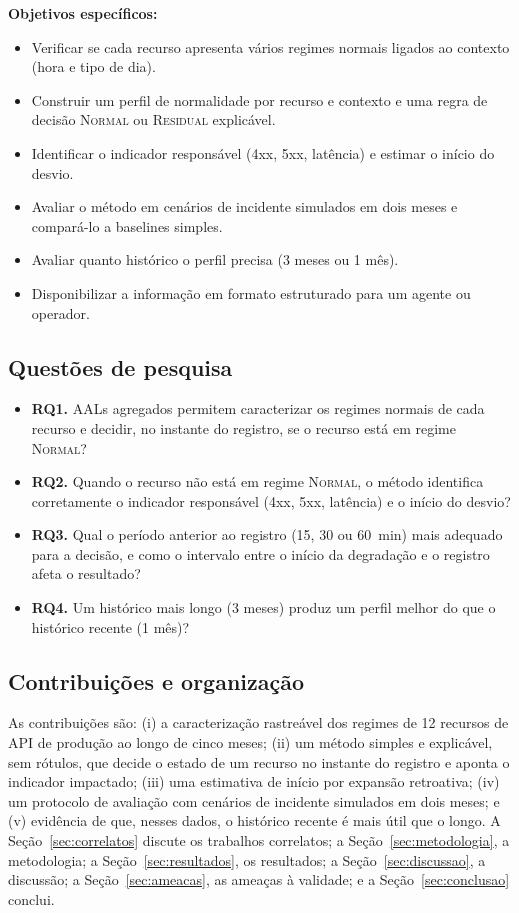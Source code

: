 \documentclass[sigconf,nonacm]{acmart}
\newcommand{\Normal}{\textsc{Normal}\xspace}
\newcommand{\Residual}{\textsc{Residual}\xspace}
\begin{document}
\textbf{Objetivos específicos:}
\begin{itemize}
  \item Verificar se cada recurso apresenta vários regimes normais ligados ao contexto (hora e tipo de dia).
  \item Construir um perfil de normalidade por recurso e contexto e uma regra de decisão \Normal ou \Residual explicável.
  \item Identificar o indicador responsável (4xx, 5xx, latência) e estimar o início do desvio.
  \item Avaliar o método em cenários de incidente simulados em dois meses e compará-lo a baselines simples.
  \item Avaliar quanto histórico o perfil precisa (3 meses ou 1 mês).
  \item Disponibilizar a informação em formato estruturado para um agente ou operador.
\end{itemize}

\subsection{Questões de pesquisa}
\begin{itemize}
  \item \textbf{RQ1.} AALs agregados permitem caracterizar os regimes normais de cada recurso e decidir, no instante do registro, se o recurso está em regime \Normal?
  \item \textbf{RQ2.} Quando o recurso não está em regime \Normal, o método identifica corretamente o indicador responsável (4xx, 5xx, latência) e o início do desvio?
  \item \textbf{RQ3.} Qual o período anterior ao registro (15, 30 ou 60~min) mais adequado para a decisão, e como o intervalo entre o início da degradação e o registro afeta o resultado?
  \item \textbf{RQ4.} Um histórico mais longo (3 meses) produz um perfil melhor do que o histórico recente (1 mês)?
\end{itemize}

\subsection{Contribuições e organização}
As contribuições são: (i) a caracterização rastreável dos regimes de 12 recursos de API de produção ao longo de cinco meses; (ii) um método simples e explicável, sem rótulos, que decide o estado de um recurso no instante do registro e aponta o indicador impactado; (iii) uma estimativa de início por expansão retroativa; (iv) um protocolo de avaliação com cenários de incidente simulados em dois meses; e (v) evidência de que, nesses dados, o histórico recente é mais útil que o longo. A Seção~\ref{sec:correlatos} discute os trabalhos correlatos; a Seção~\ref{sec:metodologia}, a metodologia; a Seção~\ref{sec:resultados}, os resultados; a Seção~\ref{sec:discussao}, a discussão; a Seção~\ref{sec:ameacas}, as ameaças à validade; e a Seção~\ref{sec:conclusao} conclui.
\end{document}
